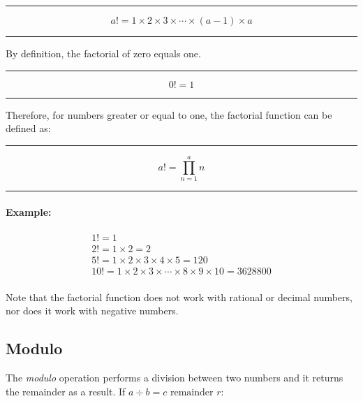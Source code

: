 \documentclass[a5paper,9pt]{book}
\theoremstyle{definition}
\newcommand{\txtlinesur}[1]{%
    \vspace*{\baselineskip}

    \hrule%

    \vspace*{\medskipamount}

    #1

    \vspace*{\medskipamount}

    \hrule%

    \vspace*{\baselineskip}
}
\newcommand{\eqlinesur}[1]{%
    \vspace*{\baselineskip}

    \hrule%

    \vspace*{\medskipamount}

    #1

    \vspace*{\medskipamount-0.5\belowdisplayskip}

    \hrule%

    \vspace*{\baselineskip}
}
\begin{document}
            \txtlinesur{%
                \begin{equation*}
                    a! = 1\times 2 \times 3 \times \cdots \times (a-1) \times a
                \end{equation*}
            }

            By definition, the factorial of zero equals one.

            \txtlinesur{%
                \begin{equation*}
                    0! = 1
                \end{equation*}
            }

            Therefore, for numbers greater or equal to one, the factorial function can
            be defined as:

            \eqlinesur{%
                \begin{equation*}
                    a! = \prod_{n=1}^{a}n
                \end{equation*}
            }

            \paragraph{Example:}
            
            \begin{gather*}
                1! = 1 \\[5pt]
                2! = 1\times 2 = 2 \\[5pt]
                5! = 1\times 2 \times 3 \times 4\times 5 = 120 \\[5pt]
                10! = 1 \times 2 \times 3 \times \cdots \times 8 \times 9 \times 10 = \num{3628800} \\
            \end{gather*}

            Note that the factorial function does not work with rational or decimal numbers,
            nor does it work with negative numbers.

            \pagebreak

            \subsection{Modulo}

            The \emph{modulo} operation performs a division between two numbers and it
            returns the remainder as a result.  If $a\div b = c \text{ remainder } r$:
\end{document}
